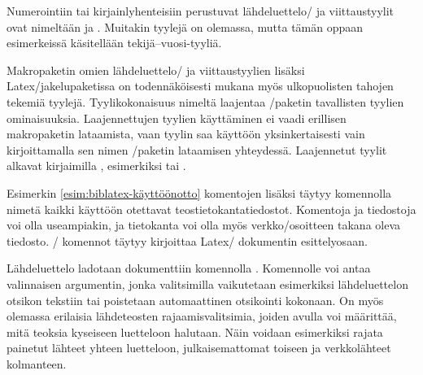 Numerointiin tai kirjainlyhenteisiin perustuvat lähdeluettelo\-/{} ja
viittaustyylit ovat nimeltään  ja
. Muitakin tyylejä on olemassa, mutta tämän
oppaan esimerkeissä käsitellään tekijä--vuosi-tyyliä.

Makropaketin omien lähdeluettelo\-/{} ja viittaustyylien lisäksi
Latex\-/jakelupaketissa on todennäköisesti mukana myös ulkopuolisten
tahojen tekemiä tyylejä. Tyylikokonaisuus nimeltä
 laajentaa
\-/paketin tavallisten tyylien ominaisuuksia.
Laajennettujen tyylien käyttäminen ei vaadi erillisen makropaketin
lataamista, vaan tyylin saa käyttöön yksinkertaisesti vain
kirjoittamalla sen nimen \-/paketin lataamisen
yhteydessä. Laajennetut tyylit alkavat kirjaimilla \mbox{,}
esimerkiksi  tai .

Esimerkin \ref{esim:biblatex-käyttöönotto} komentojen lisäksi täytyy
komennolla  nimetä kaikki käyttöön otettavat
teostietokantatiedostot. Komentoja ja tiedostoja voi olla useampiakin,
ja tietokanta voi olla myös verkko\-/osoitteen takana oleva tiedosto.
\-/ komennot täytyy kirjoittaa Latex\-/
dokumentin esittelyosaan.

\begin{koodilohkosis}
  
  
  
\end{koodilohkosis}

Lähdeluettelo ladotaan dokumenttiin komennolla
. Komennolle voi antaa valinnaisen
argumentin, jonka valitsimilla vaikutetaan esimerkiksi lähdeluettelon
otsikon tekstiin tai poistetaan automaattinen otsikointi kokonaan. On
myös olemassa erilaisia lähdeteosten rajaamisvalitsimia, joiden avulla
voi määrittää, mitä teoksia kyseiseen luetteloon halutaan. Näin voidaan
esimerkiksi rajata painetut lähteet yhteen luetteloon, julkaisemattomat
toiseen ja verkkolähteet kolmanteen.

\begin{koodilohkosis}
  \printbibliography
  \printbibliography[title={Lähteet}]
  \printbibliography[heading=none,  %
    type=online]           %
\end{koodilohkosis}

